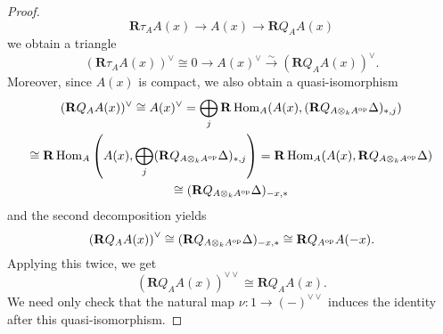 \begin{proof}
  \[\mathbf{R}\tau_A A(x) \to A(x) \to \mathbf{R}Q_A A(x)\]
  we obtain a triangle %
  \[(\mathbf{R}\tau_A A(x))^\vee \cong 0 \to A(x)^\vee \overset{\sim}\to (\mathbf{R}Q_A A(x))^\vee.\]
  Moreover, since \(A(x)\) is compact, we also obtain a quasi-isomorphism
  \begin{gather*}
    (\mathbf{R}Q_A A(x))^\vee
    \cong A(x)^\vee
    = \bigoplus_j \mathbf{R}\operatorname{Hom}_A(A(x), (\mathbf{R}Q_{A \otimes_k A^{\operatorname{op}}}\Delta)_{\ast,j})\\
    \cong \mathbf{R}\operatorname{Hom}_A\left(A(x), \bigoplus_j(\mathbf{R}Q_{A \otimes_k A^{\operatorname{op}}}\Delta)_{\ast,j}\right)
    = \mathbf{R}\operatorname{Hom}_A(A(x), \mathbf{R}Q_{A \otimes_k A^{\operatorname{op}}} \Delta) \\
    \cong (\mathbf{R}Q_{A \otimes_k A^{\operatorname{op}}} \Delta)_{-x,\ast}
  \end{gather*}
  and the second decomposition yields
  \begin{displaymath}
    \left(\mathbf{R}Q_A A(x)\right)^\vee \cong (\mathbf{R}Q_{A \otimes_k A^{\operatorname{op}}} \Delta)_{-x,\ast} \cong \mathbf{R}Q_{A^{\operatorname{op}}} A(-x).
  \end{displaymath}
  Applying this twice, we get 
  \begin{displaymath}
    (\mathbf{R}Q_A A(x))^{\vee \vee} \cong \mathbf{R}Q_A A(x).
  \end{displaymath}
  We need only check that the natural map \(\nu : 1 \to (-)^{\vee \vee}\) induces the identity after this quasi-isomorphism.




\end{proof}
